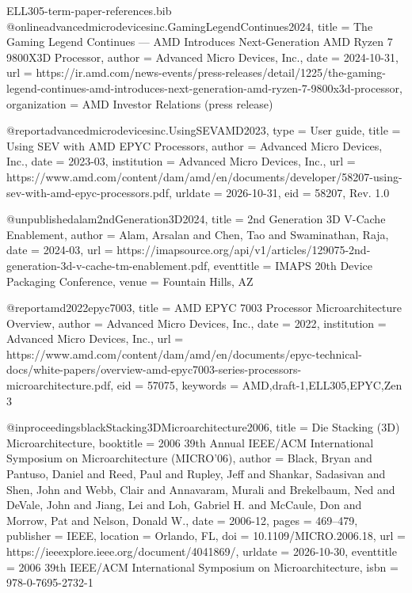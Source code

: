 \begin{filecontents*}[overwrite]{ELL305-term-paper-references.bib}
@online{advancedmicrodevicesinc.GamingLegendContinues2024,
  title = {The {{Gaming Legend Continues}} — {{AMD Introduces Next-Generation AMD Ryzen}} 7 {{9800X3D Processor}}},
  author = {{Advanced Micro Devices, Inc.}},
  date = {2024-10-31},
  url = {https://ir.amd.com/news-events/press-releases/detail/1225/the-gaming-legend-continues-amd-introduces-next-generation-amd-ryzen-7-9800x3d-processor},
  organization = {AMD Investor Relations (press release)}
}

@report{advancedmicrodevicesinc.UsingSEVAMD2023,
  type = {User guide},
  title = {Using {{SEV}} with {{AMD EPYC Processors}}},
  author = {{Advanced Micro Devices, Inc.}},
  date = {2023-03},
  institution = {Advanced Micro Devices, Inc.},
  url = {https://www.amd.com/content/dam/amd/en/documents/developer/58207-using-sev-with-amd-epyc-processors.pdf},
  urldate = {2026-10-31},
  eid = {58207, Rev. 1.0}
}

@unpublished{alam2ndGeneration3D2024,
  title = {2nd {{Generation 3D V-Cache Enablement}}},
  author = {Alam, Arsalan and Chen, Tao and Swaminathan, Raja},
  date = {2024-03},
  url = {https://imapsource.org/api/v1/articles/129075-2nd-generation-3d-v-cache-tm-enablement.pdf},
  eventtitle = {{{IMAPS}} 20th {{Device Packaging Conference}}},
  venue = {Fountain Hills, AZ}
}

@report{amd2022epyc7003,
  title = {{{AMD EPYC}} 7003 Processor Microarchitecture Overview},
  author = {{Advanced Micro Devices, Inc.}},
  date = {2022},
  institution = {Advanced Micro Devices, Inc.},
  url = {https://www.amd.com/content/dam/amd/en/documents/epyc-technical-docs/white-papers/overview-amd-epyc7003-series-processors-microarchitecture.pdf},
  eid = {57075},
  keywords = {AMD,draft-1,ELL305,EPYC,Zen 3}
}

@inproceedings{blackStacking3DMicroarchitecture2006,
  title = {Die {{Stacking}} ({{3D}}) {{Microarchitecture}}},
  booktitle = {2006 39th {{Annual IEEE}}/{{ACM International Symposium}} on {{Microarchitecture}} ({{MICRO}}'06)},
  author = {Black, Bryan and Pantuso, Daniel and Reed, Paul and Rupley, Jeff and Shankar, Sadasivan and Shen, John and Webb, Clair and Annavaram, Murali and Brekelbaum, Ned and DeVale, John and Jiang, Lei and Loh, Gabriel H. and McCaule, Don and Morrow, Pat and Nelson, Donald W.},
  date = {2006-12},
  pages = {469--479},
  publisher = {IEEE},
  location = {Orlando, FL},
  doi = {10.1109/MICRO.2006.18},
  url = {https://ieeexplore.ieee.org/document/4041869/},
  urldate = {2026-10-30},
  eventtitle = {2006 39th {{IEEE}}/{{ACM International Symposium}} on {{Microarchitecture}}},
  isbn = {978-0-7695-2732-1}
}


\end{filecontents*}
